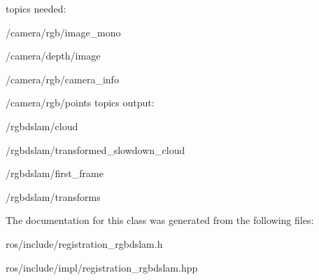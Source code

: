topics needed:
\begin{DoxyItemize}
\item /camera/rgb/image\_\-mono
\item /camera/depth/image
\item /camera/rgb/camera\_\-info
\item /camera/rgb/points topics output:
\item /rgbdslam/cloud
\item /rgbdslam/transformed\_\-slowdown\_\-cloud
\item /rgbdslam/first\_\-frame
\item /rgbdslam/transforms 
\end{DoxyItemize}

The documentation for this class was generated from the following files:\begin{DoxyCompactItemize}
\item 
ros/include/registration\_\-rgbdslam.h\item 
ros/include/impl/registration\_\-rgbdslam.hpp\end{DoxyCompactItemize}
